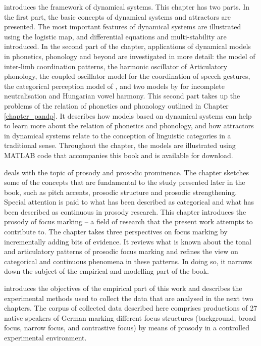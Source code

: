 introduces the framework of dynamical systems. This chapter has two parts. In the first part, the basic concepts of dynamical systems and attractors are presented. The most important features of dynamical systems are illustrated using the logistic map, and differential equations and multi-stability are introduced. In the second part of the chapter, applications of dynamical models in phonetics, phonology and beyond are investigated in more detail: the \citet{HakenKelsoBunz1985} model of inter-limb coordination patterns, the harmonic oscillator of Articulatory phonology, the coupled oscillator model for the coordination of speech gestures, the categorical perception model of \cite{Tulleretal1994}, and two models by \citet{GafosBenus2006} for incomplete neutralisation and Hungarian vowel harmony. This second part takes up the problems of the relation of phonetics and phonology outlined in Chapter \ref{chapter_pandp}. It describes how models based on dynamical systems can help to learn more about the relation of phonetics and phonology, and how attractors in dynamical systems relate to the conception of linguistic categories in a traditional sense. Throughout the chapter, the models are illustrated using MATLAB code that accompanies this book and is available for download.

 deals with the topic of prosody and prosodic prominence. The chapter sketches some of the concepts that are fundamental to the study presented later in the book, such as pitch accents, prosodic structure and prosodic strengthening. Special attention is paid to what has been described as categorical and what has been described as continuous in prosody research. This chapter introduces the prosody of focus marking -- a field of research that the present work attempts to contribute to. The chapter takes three perspectives on focus marking by incrementally adding bits of evidence. It reviews what is known about the tonal and articulatory patterns of prosodic focus marking and refines the view on categorical and continuous phenomena in these patterns. In doing so, it narrows down the subject of the empirical and modelling part of the book. 

 introduces the objectives of the empirical part of this work and describes the experimental methods used to collect the data that are analysed in the next two chapters. The corpus of collected data described here comprises productions of 27 native speakers of German marking different focus structures (background, broad focus, narrow focus, and contrastive focus) by means of prosody in a controlled experimental environment.

